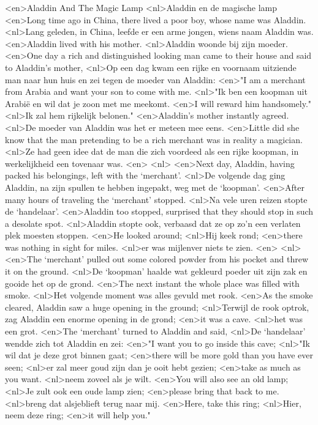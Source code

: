 <en>Aladdin And The Magic Lamp
<nl>Aladdin en de magische lamp
<en>Long time ago in China, there lived a poor boy, whose name was Aladdin.
<nl>Lang geleden, in China, leefde er een arme jongen, wiens naam Aladdin was.
<en>Aladdin lived with his mother.
<nl>Aladdin woonde bij zijn moeder.
<en>One day a rich and distinguished looking man came to their house and said to Aladdin's mother,
<nl>Op een dag kwam een rijke en voornaam uitziende man naar hun huis en zei tegen de moeder van Aladdin:
<en>"I am a merchant from Arabia and want your son to come with me.
<nl>"Ik ben een koopman uit Arabië en wil dat je zoon met me meekomt.
<en>I will reward him handsomely."
<nl>Ik zal hem rijkelijk belonen."
<en>Aladdin's mother instantly agreed.
<nl>De moeder van Aladdin was het er meteen mee eens.
<en>Little did she know that the man pretending to be a rich merchant was in reality a magician.
<nl>Ze had geen idee dat de man die zich voordeed als een rijke koopman, in werkelijkheid een tovenaar was.
<en>
<nl>
<en>Next day, Aladdin, having packed his belongings, left with the `merchant'.
<nl>De volgende dag ging Aladdin, na zijn spullen te hebben ingepakt, weg met de `koopman'.
<en>After many hours of traveling the `merchant' stopped.
<nl>Na vele uren reizen stopte de `handelaar'.
<en>Aladdin too stopped, surprised that they should stop in such a desolate spot.
<nl>Aladdin stopte ook, verbaasd dat ze op zo'n een verlaten plek moesten stoppen.
<en>He looked around;
<nl>Hij keek rond;
<en>there was nothing in sight for miles.
<nl>er was mijlenver niets te zien.
<en>
<nl>
<en>The `merchant' pulled out some colored powder from his pocket and threw it on the ground.
<nl>De `koopman' haalde wat gekleurd poeder uit zijn zak en gooide het op de grond.
<en>The next instant the whole place was filled with smoke.
<nl>Het volgende moment was alles gevuld met rook.
<en>As the smoke cleared, Aladdin saw a huge opening in the ground;
<nl>Terwijl de rook optrok, zag Aladdin een enorme opening in de grond;
<en>it was a cave.
<nl>het was een grot.
<en>The `merchant' turned to Aladdin and said,
<nl>De `handelaar' wendde zich tot Aladdin en zei:
<en>"I want you to go inside this cave;
<nl>"Ik wil dat je deze grot binnen gaat;
<en>there will be more gold than you have ever seen;
<nl>er zal meer goud zijn dan je ooit hebt gezien;
<en>take as much as you want.
<nl>neem zoveel als je wilt.
<en>You will also see an old lamp;
<nl>Je zult ook een oude lamp zien;
<en>please bring that back to me.
<nl>breng dat alsjeblieft terug naar mij.
<en>Here, take this ring;
<nl>Hier, neem deze ring;
<en>it will help you."
